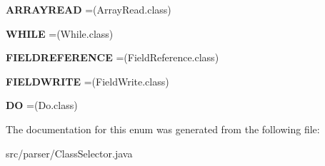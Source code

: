 \begin{DoxyCompactItemize}
\item 
{\bfseries A\+R\+R\+A\+Y\+R\+E\+AD} =(Array\+Read.\+class)\hypertarget{enumparser_1_1_class_selector_a58ffc669f7cf9967fcbafd364889dfed}{}\label{enumparser_1_1_class_selector_a58ffc669f7cf9967fcbafd364889dfed}

\item 
{\bfseries W\+H\+I\+LE} =(While.\+class)\hypertarget{enumparser_1_1_class_selector_a110228e91448ae01070154ef5da74a64}{}\label{enumparser_1_1_class_selector_a110228e91448ae01070154ef5da74a64}

\item 
{\bfseries F\+I\+E\+L\+D\+R\+E\+F\+E\+R\+E\+N\+CE} =(Field\+Reference.\+class)\hypertarget{enumparser_1_1_class_selector_a51ebd153872ee4b07cf23e8971cdd9ec}{}\label{enumparser_1_1_class_selector_a51ebd153872ee4b07cf23e8971cdd9ec}

\item 
{\bfseries F\+I\+E\+L\+D\+W\+R\+I\+TE} =(Field\+Write.\+class)\hypertarget{enumparser_1_1_class_selector_a3c043d1c27be845c719dd90827a1c077}{}\label{enumparser_1_1_class_selector_a3c043d1c27be845c719dd90827a1c077}

\item 
{\bfseries DO} =(Do.\+class)\hypertarget{enumparser_1_1_class_selector_a75a99dee0208cedda9108b430b722b08}{}\label{enumparser_1_1_class_selector_a75a99dee0208cedda9108b430b722b08}

\end{DoxyCompactItemize}


The documentation for this enum was generated from the following file\+:\begin{DoxyCompactItemize}
\item 
src/parser/Class\+Selector.\+java\end{DoxyCompactItemize}
